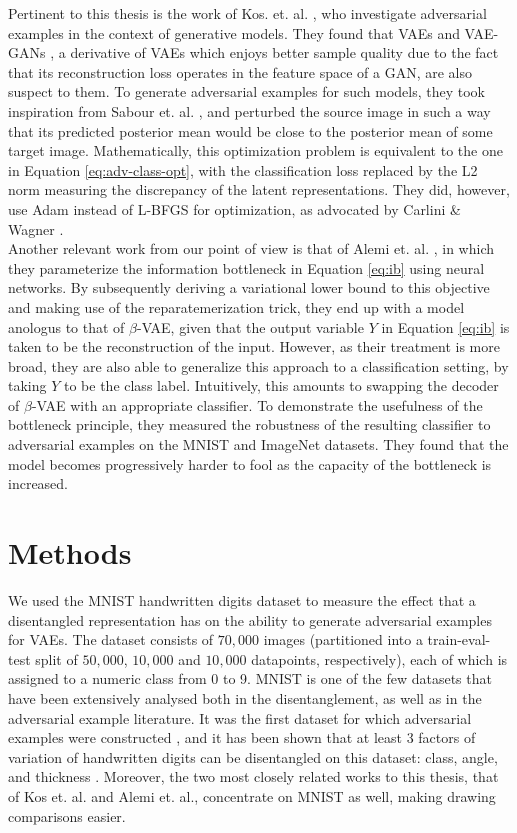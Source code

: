 \documentclass{report}
\begin{document}
\noindent Pertinent to this thesis is the work of Kos. et. al. \cite{kos-gen-adv}, who investigate adversarial examples in the context of generative models. They found that VAEs and VAE-GANs \cite{vaegan}, a derivative of VAEs which enjoys better sample quality due to the fact that its reconstruction loss operates in the feature space of a GAN, are also suspect to them. To generate adversarial examples for such models, they took inspiration from Sabour et. al. \cite{sabour}, and perturbed the source image in such a way that its predicted posterior mean would be close to the posterior mean of some target image. Mathematically, this optimization problem is equivalent to the one in Equation \ref{eq:adv-class-opt}, with the classification loss replaced by the L2 norm measuring the discrepancy of the latent representations. They did, however, use Adam instead of L-BFGS for optimization, as advocated by Carlini \& Wagner \cite{carlini-wagner-16}. \\

\noindent Another relevant work from our point of view is that of Alemi et. al. \cite{deep-variational-bottleneck}, in which they parameterize the information bottleneck in Equation \ref{eq:ib} using neural networks. By subsequently deriving a variational lower bound to this objective and making use of the reparatemerization trick, they end up with a model anologus to that of $\beta$-VAE, given that the output variable $Y$ in Equation \ref{eq:ib} is taken to be the reconstruction of the input. However, as their treatment is more broad, they are also able to generalize this approach to a classification setting, by taking $Y$ to be the class label. Intuitively, this amounts to swapping the decoder of $\beta$-VAE with an appropriate classifier. To demonstrate the usefulness of the bottleneck principle, they measured the robustness of the resulting classifier to adversarial examples on the MNIST and ImageNet datasets. They found that the model becomes progressively harder to fool as the capacity of the bottleneck is increased.

\chapter{Methods}

\noindent We used the MNIST handwritten digits dataset to measure the effect that a disentangled representation has on the ability to generate adversarial examples for VAEs. The dataset consists of $70,000$ images (partitioned into a train-eval-test split of $50,000$, $10,000$ and $10,000$ datapoints, respectively), each of which is assigned to a numeric class from 0 to 9. MNIST is one of the few datasets that have been extensively analysed both in the disentanglement, as well as in the adversarial example literature. It was the first dataset for which adversarial examples were constructed \cite{intriguing-properties}, and it has been shown that at least 3 factors of variation of handwritten digits can be disentangled on this dataset: class, angle, and thickness \cite{infogan, joint-vae}. Moreover, the two most closely related works to this thesis, that of Kos et. al. and Alemi et. al., concentrate on MNIST as well, making drawing comparisons easier. \\
\end{document}
